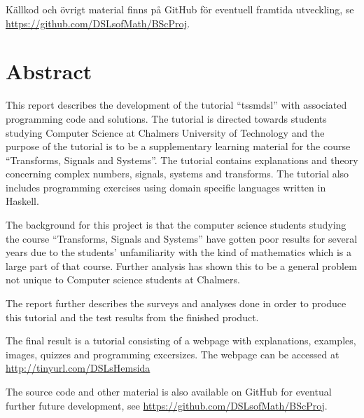 \documentclass[12pt,a4paper,twoside,openright]{article}
\begin{document}
Källkod och övrigt material finns på GitHub för eventuell framtida utveckling, se
\url{https://github.com/DSLsofMath/BScProj}.

\newpage

\thispagestyle{plain}

\section*{Abstract}

This report describes the development of the tutorial ``\gls{tssmdsl}''
with associated programming code and solutions. The tutorial is
directed towards students studying Computer Science at Chalmers
University of Technology and the purpose of the tutorial is to be a
supplementary learning material for the course ``Transforms, Signals
and Systems''. The tutorial contains explanations and theory
concerning complex numbers, signals, systems and transforms. The
tutorial also includes programming exercises using domain specific
languages written in Haskell.

The background for this project is that the computer science students
studying the course ``Transforms, Signals and Systems'' have gotten
poor results for several years due to the students' unfamiliarity with
the kind of mathematics which is a large part of that course. Further
analysis has shown this to be a general problem not unique to Computer
science students at Chalmers.

The report further describes the surveys and analyses done in order to
produce this tutorial and the test results from the finished product.

The final result is a tutorial consisting of a webpage with
explanations, examples, images, quizzes and programming
excersizes. The webpage can be accessed at \\
\url{http://tinyurl.com/DSLsHemsida}

The source code and other material is also available on GitHub for
eventual further future development, see
\url{https://github.com/DSLsofMath/BScProj}.

\newpage

\tableofcontents

\newpage

\setlength{\parskip}{1mm}
\printglossaries

\newpage

\setcounter{page}{1}
\setlength{\parskip}{2mm plus2mm}
\end{document}
